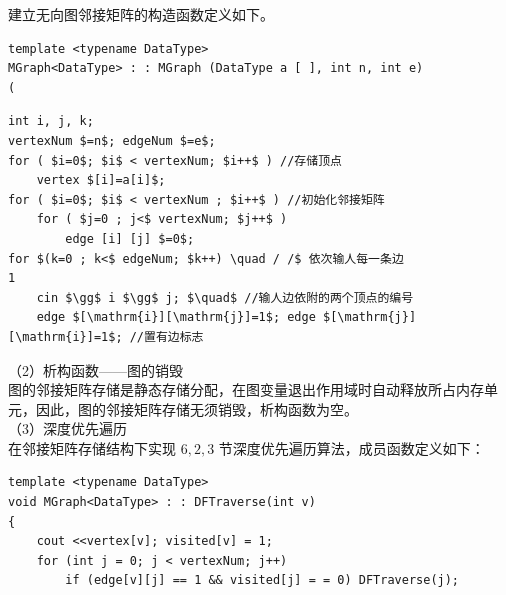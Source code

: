 \documentclass[10pt]{article}
\begin{document}
建立无向图邻接矩阵的构造函数定义如下。

\begin{verbatim}
template <typename DataType>
MGraph<DataType> : : MGraph (DataType a [ ], int n, int e)
(
\end{verbatim}

\begin{verbatim}
int i, j, k;
vertexNum $=n$; edgeNum $=e$;
for ( $i=0$; $i$ < vertexNum; $i++$ ) //存储顶点
    vertex $[i]=a[i]$;
for ( $i=0$; $i$ < vertexNum ; $i++$ ) //初始化邻接矩阵
    for ( $j=0 ; j<$ vertexNum; $j++$ )
        edge [i] [j] $=0$;
for $(k=0 ; k<$ edgeNum; $k++) \quad / /$ 依次输人每一条边
1
    cin $\gg$ i $\gg$ j; $\quad$ //输人边依附的两个顶点的编号
    edge $[\mathrm{i}][\mathrm{j}]=1$; edge $[\mathrm{j}][\mathrm{i}]=1$; //置有边标志
\end{verbatim}

（2）析构函数——图的销毁\\
图的邻接矩阵存储是静态存储分配，在图变量退出作用域时自动释放所占内存单元，因此，图的邻接矩阵存储无须销毁，析构函数为空。\\
（3）深度优先遍历\\
在邻接矩阵存储结构下实现 $6,2,3$ 节深度优先遍历算法，成员函数定义如下：

\begin{verbatim}
template <typename DataType>
void MGraph<DataType> : : DFTraverse(int v)
{
    cout <<vertex[v]; visited[v] = 1;
    for (int j = 0; j < vertexNum; j++)
        if (edge[v][j] == 1 && visited[j] = = 0) DFTraverse(j);
\end{verbatim}
\end{document}
